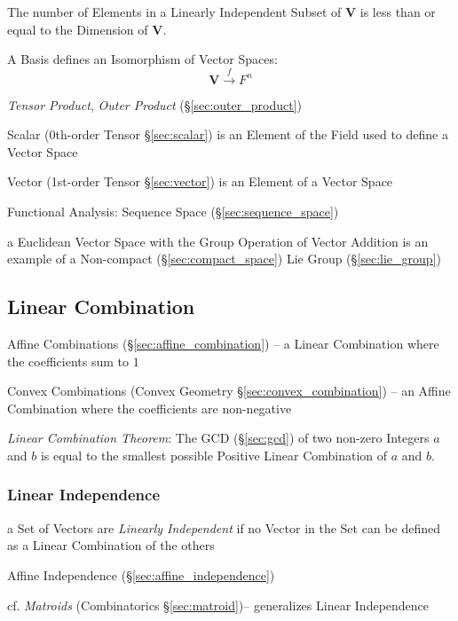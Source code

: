 The number of Elements in a Linearly Independent Subset of
$\mathbf{V}$ is less than or equal to the Dimension of $\mathbf{V}$.

A Basis defines an Isomorphism of Vector Spaces:
\[
    \mathbf{V} \xrightarrow{f} F^n
\]

\emph{Tensor Product}, \emph{Outer Product} (\S\ref{sec:outer_product})

Scalar (0th-order Tensor \S\ref{sec:scalar}) is an Element of the
Field used to define a Vector Space

Vector (1st-order Tensor \S\ref{sec:vector}) is an Element of a Vector
Space

Functional Analysis: Sequence Space (\S\ref{sec:sequence_space})

a Euclidean Vector Space with the Group Operation of Vector Addition is an
example of a Non-compact (\S\ref{sec:compact_space}) Lie Group
(\S\ref{sec:lie_group})



\subsection{Linear Combination}\label{sec:linear_combination}

\fist Affine Combinations (\S\ref{sec:affine_combination}) -- a Linear
Combination where the coefficients sum to $1$

\fist Convex Combinations (Convex Geometry \S\ref{sec:convex_combination}) -- an
Affine Combination where the coefficients are non-negative

\emph{Linear Combination Theorem}: The GCD (\S\ref{sec:gcd}) of two non-zero
Integers $a$ and $b$ is equal to the smallest possible Positive Linear
Combination of $a$ and $b$.



\subsubsection{Linear Independence}\label{sec:linear_independence}

a Set of Vectors are \emph{Linearly Independent} if no Vector in the Set can be
defined as a Linear Combination of the others

\fist Affine Independence (\S\ref{sec:affine_independence})

\fist cf. \emph{Matroids} (Combinatorics \S\ref{sec:matroid})-- generalizes
Linear Independence



